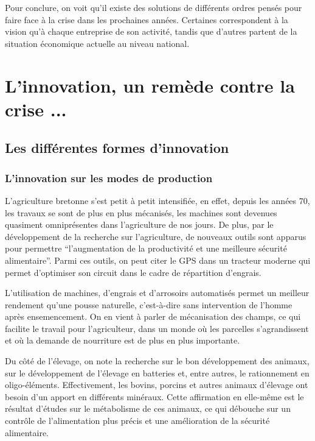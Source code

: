 \documentclass[a4paper,12pt]{report}
\begin{document}
			Pour conclure, on voit qu’il existe des solutions de différents ordres pensés pour faire face à la crise dans les prochaines années. Certaines correspondent à la vision qu’à chaque entreprise de son activité, tandis que d’autres partent de la situation économique actuelle au niveau national.
			
\chapter{L'innovation, un remède contre la crise ...}
	
	\section{Les différentes formes d'innovation}
	
		\subsection{L'innovation sur les modes de production}
			L’agriculture bretonne s’est petit à petit intensifiée, en effet, depuis les années 70, les travaux se sont de plus en plus mécanisés, les machines sont devenues quasiment omniprésentes dans l’agriculture de nos jours. De plus, par le développement de la recherche sur l’agriculture, de nouveaux outils sont apparus pour permettre “l’augmentation de la productivité et une meilleure sécurité alimentaire”\cite{FAOStatisticalYearbook2013}. Parmi ces outils, on peut citer le GPS dans un tracteur moderne\cite{RobotsChamps} qui permet d’optimiser son circuit dans le cadre de répartition d’engrais.
			
			
			L’utilisation de machines, d’engrais et d’arrosoirs automatisés permet un meilleur rendement qu’une pousse naturelle, c’est-à-dire sans intervention de l’homme après ensemencement. On en vient à parler de mécanisation des champs, ce qui facilite le travail pour l’agriculteur, dans un monde où les parcelles s’agrandissent et où la demande de nourriture est de plus en plus importante.
			
			Du côté de l’élevage, on note la recherche sur le bon développement des animaux, sur le développement de l’élevage en batteries et, entre autres, le rationnement en oligo-éléments\cite{OligoElements}. Effectivement, les bovins, porcins et autres animaux d’élevage ont besoin d’un apport en différents minéraux. Cette affirmation en elle-même est le résultat d’études sur le métabolisme de ces animaux, ce qui débouche sur un contrôle de l’alimentation plus précis et une amélioration de la sécurité alimentaire.
			
\end{document}
